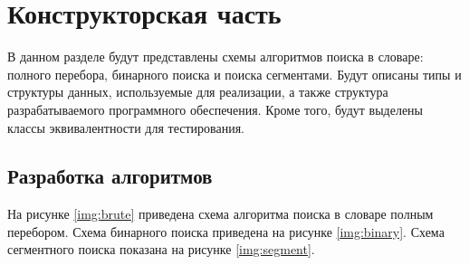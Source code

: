 \chapter{Конструкторская часть}

В данном разделе будут представлены схемы алгоритмов поиска в словаре: полного перебора, бинарного поиска и поиска сегментами. Будут описаны типы и структуры данных, используемые для реализации, а также структура разрабатываемого программного обеспечения. Кроме того, будут выделены классы эквивалентности для тестирования.

\section{Разработка алгоритмов}

На рисунке \ref{img:brute} приведена схема алгоритма поиска в словаре полным перебором. Схема бинарного поиска приведена на рисунке \ref{img:binary}. Схема сегментного поиска показана на рисунке \ref{img:segment}.

